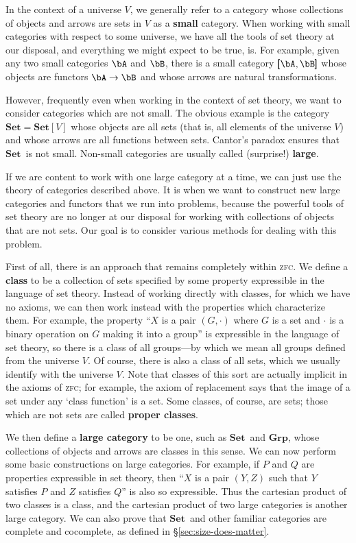 \documentclass{amsart}
\newcommand{\Set}{\ensuremath{\mathbf{Set}}}
\def\zfc{\textsc{zfc}}
\begin{document}
In the context of a universe $V$, we generally refer to a category
whose collections of objects and arrows are sets in $V$ as a
\textbf{small} category.  When working with small categories with
respect to some universe, we have all the tools of set theory at our
disposal, and everything we might expect to be true, is.  For example,
given any two small categories $\bA$ and $\bB$, there is a small
category $\pmb[\bA,\bB\pmb]$ whose objects are functors $\bA\to \bB$
and whose arrows are natural transformations.

However, frequently even when working in the context of set theory, we
want to consider categories which are not small.  The obvious example
is the category $\Set = \Set[V]$ whose objects are all sets (that is,
all elements of the universe $V$) and whose arrows are all functions
between sets.  Cantor's paradox ensures that \Set\ is not small.
Non-small categories are usually called (surprise!) \textbf{large}.

If we are content to work with one large category at a time, we can
just use the theory of categories described above.  It is when we want
to construct new large categories and functors that we run into
problems, because the powerful tools of set theory are no longer at
our disposal for working with collections of objects that are not
sets.  Our goal is to consider various methods for dealing with this
problem.

First of all, there is an approach that remains completely within \zfc.
We define a \textbf{class} to be a collection of sets specified by
some property expressible in the language of set theory.  Instead of
working directly with classes, for which we have no axioms, we can
then work instead with the properties which characterize them.  For
example, the property ``$X$ is a pair $(G,\cdot)$ where $G$ is a set
and $\cdot$ is a binary operation on $G$ making it into a group'' is
expressible in the language of set theory, so there is a class of all
groups---by which we mean all groups defined from the universe $V$.
Of course, there is also a class of all sets, which we usually
identify with the universe $V$.  Note that classes of this sort are
actually implicit in the axioms of \zfc; for example, the axiom of
replacement says that the image of a set under any `class function' is
a set.  Some classes, of course, are sets; those which are not sets
are called \textbf{proper classes}.

We then define a \textbf{large category} to be one, such as \Set\ and
$\mathbf{Grp}$, whose collections of objects and arrows are classes in
this sense.  We can now perform some basic constructions on large
categories.  For example, if $P$ and $Q$ are properties expressible in
set theory, then ``$X$ is a pair $(Y,Z)$ such that $Y$ satisfies $P$
and $Z$ satisfies $Q$'' is also so expressible.  Thus the cartesian
product of two classes is a class, and the cartesian product of two
large categories is another large category.  We can also prove that
\Set\ and other familiar categories are complete and cocomplete, as
defined in \S\ref{sec:size-does-matter}.
\end{document}
